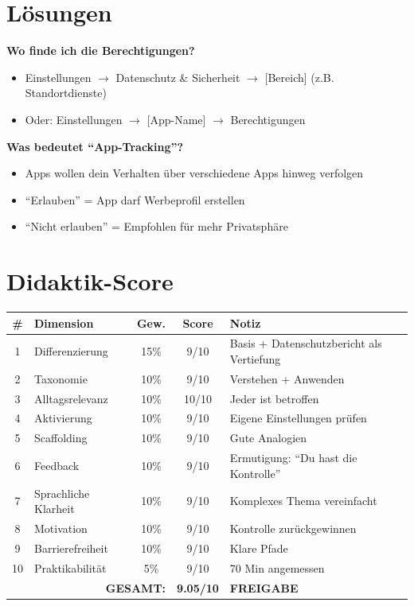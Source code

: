 \documentclass[11pt,a4paper]{article}
\begin{document}
\section{Lösungen}

\textbf{Wo finde ich die Berechtigungen?}
\begin{itemize}
    \item Einstellungen $\rightarrow$ Datenschutz \& Sicherheit $\rightarrow$ [Bereich] (z.B. Standortdienste)
    \item Oder: Einstellungen $\rightarrow$ [App-Name] $\rightarrow$ Berechtigungen
\end{itemize}

\textbf{Was bedeutet ``App-Tracking''?}
\begin{itemize}
    \item Apps wollen dein Verhalten über verschiedene Apps hinweg verfolgen
    \item ``Erlauben'' = App darf Werbeprofil erstellen
    \item ``Nicht erlauben'' = Empfohlen für mehr Privatsphäre
\end{itemize}

\section{Didaktik-Score}

\begin{scorebox}
\begin{tabular}{|c|l|c|c|p{3.5cm}|}
\hline
\# & Dimension & Gew. & Score & Notiz \\
\hline
1 & Differenzierung & 15\% & 9/10 & Basis + Datenschutzbericht als Vertiefung \\
2 & Taxonomie & 10\% & 9/10 & Verstehen + Anwenden \\
3 & Alltagsrelevanz & 10\% & 10/10 & Jeder ist betroffen \\
4 & Aktivierung & 10\% & 9/10 & Eigene Einstellungen prüfen \\
5 & Scaffolding & 10\% & 9/10 & Gute Analogien \\
6 & Feedback & 10\% & 9/10 & Ermutigung: ``Du hast die Kontrolle'' \\
7 & Sprachliche Klarheit & 10\% & 9/10 & Komplexes Thema vereinfacht \\
8 & Motivation & 10\% & 9/10 & Kontrolle zurückgewinnen \\
9 & Barrierefreiheit & 10\% & 9/10 & Klare Pfade \\
10 & Praktikabilität & 5\% & 9/10 & 70 Min angemessen \\
\hline
\multicolumn{3}{|r|}{\textbf{GESAMT:}} & \textbf{9.05/10} & \textcolor{successgreen}{\textbf{FREIGABE}} \\
\hline
\end{tabular}
\end{scorebox}
\end{document}

